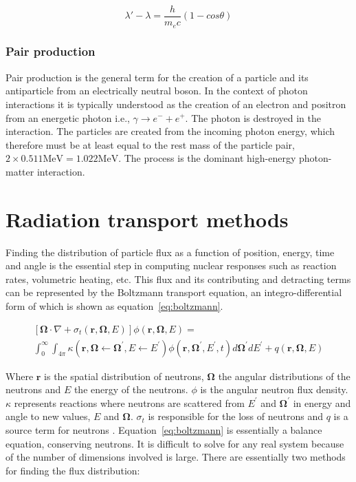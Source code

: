 \begin{equation}
  \label{eq:compton_scattering}
  \lambda' - \lambda = \frac{h}{m_{e}c}(1-cos\theta)
\end{equation}

\subsubsection{Pair production}
Pair production is the general term for the creation of a particle and its antiparticle from an electrically neutral boson. In the context of photon interactions it is typically understood as the creation of an electron and positron from an energetic photon i.e., $\gamma \rightarrow e^- + e^+$. The photon is destroyed in the interaction. The particles are created from the incoming photon energy, which therefore must be at least equal to the rest mass of the particle pair, $2 \times 0.511 \mathrm{MeV} = 1.022 \mathrm{MeV}$. The process is the dominant high-energy photon-matter interaction. 

\section{Radiation transport methods}
\label{sec:radiation_transport}
Finding the distribution of particle flux as a function of position, energy, time and angle is the essential step in computing nuclear responses such as reaction rates, volumetric heating, etc. This flux and its contributing and detracting terms can be represented by the Boltzmann transport equation, an integro-differential form of which is shown as equation~\ref{eq:boltzmann}.

\begin{multline}
  \label{eq:boltzmann}
  \left[ \bm{\Omega} \cdot \nabla + \sigma_{t}(\bm{r},\bm{\Omega},E) \right] \phi(\bm{r},\bm{\Omega},E) = \\ \int_{0}^{\infty} \int_{4 \pi} \kappa (\bm{r}, \bm{\Omega} \leftarrow \bm{\Omega^{\prime}}, E \leftarrow E^{\prime}) \phi(\bm{r},\bm{\Omega^{\prime}},E^{\prime},t) d\bm{\Omega^{\prime}} dE^{\prime} + q(\bm{r},\bm{\Omega},E)
\end{multline}

Where $\bm{r}$ is the spatial distribution of neutrons, $\bm{\Omega}$ the angular distributions of the neutrons and $E$ the energy of the neutrons. $\phi$ is the angular neutron flux density. $\kappa$ represents reactions where neutrons are scattered from $E^{\prime}$ and $\bm{\Omega^{\prime}}$ in energy and angle to new values, $E$ and $\bm{\Omega}$. $\sigma_{t}$ is responsible for the loss of neutrons and $q$ is a source term for neutrons \cite{Hanus2014}. Equation~\ref{eq:boltzmann} is essentially a balance equation, conserving neutrons. It is difficult to solve for any real system because of the number of dimensions involved is large. There are essentially two methods for finding the flux distribution:

